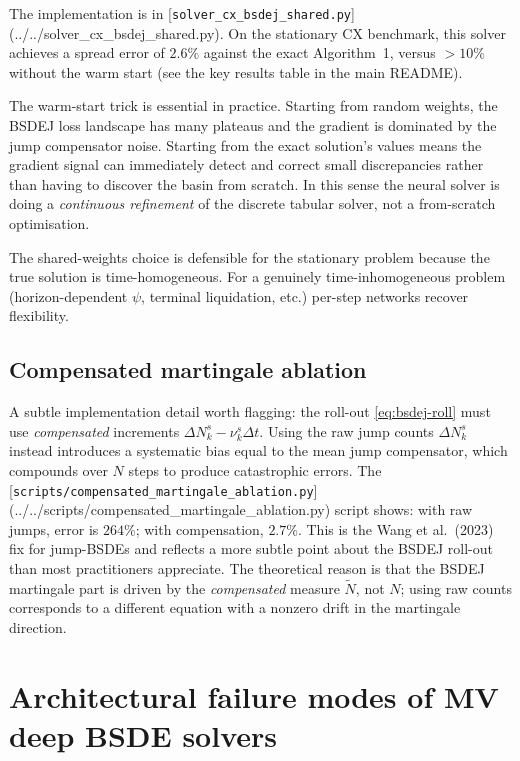 The implementation is in [\texttt{solver\_cx\_bsdej\_shared.py}](../../solver_cx_bsdej_shared.py). On the stationary CX benchmark, this solver achieves a spread error of $2.6\%$ against the exact Algorithm~1, versus $>10\%$ without the warm start (see the key results table in the main README).

\begin{intuition}
The warm-start trick is essential in practice. Starting from random weights, the BSDEJ loss landscape has many plateaus and the gradient is dominated by the jump compensator noise. Starting from the exact solution's values means the gradient signal can immediately detect and correct small discrepancies rather than having to discover the basin from scratch. In this sense the neural solver is doing a \emph{continuous refinement} of the discrete tabular solver, not a from-scratch optimisation.

The shared-weights choice is defensible for the stationary problem because the true solution is time-homogeneous. For a genuinely time-inhomogeneous problem (horizon-dependent $\psi$, terminal liquidation, etc.) per-step networks recover flexibility.
\end{intuition}

\subsection{Compensated martingale ablation}

A subtle implementation detail worth flagging: the roll-out \eqref{eq:bsdej-roll} must use \emph{compensated} increments $\Delta N^s_k - \nu^s_k \Delta t$. Using the raw jump counts $\Delta N^s_k$ instead introduces a systematic bias equal to the mean jump compensator, which compounds over $N$ steps to produce catastrophic errors. The [\texttt{scripts/compensated\_martingale\_ablation.py}](../../scripts/compensated_martingale_ablation.py) script shows: with raw jumps, error is $264\%$; with compensation, $2.7\%$. This is the Wang et al.\ (2023) \cite{wang2023} fix for jump-BSDEs and reflects a more subtle point about the BSDEJ roll-out than most practitioners appreciate. The theoretical reason is that the BSDEJ martingale part is driven by the \emph{compensated} measure $\tilde N$, not $N$; using raw counts corresponds to a different equation with a nonzero drift in the martingale direction.

\section{Architectural failure modes of MV deep BSDE solvers}
\label{sec:arch-failure-modes}

